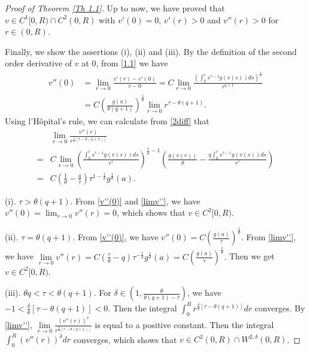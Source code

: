 \documentclass[a4paper,11pt]{amsart}
\theoremstyle{plain}
\theoremstyle{remark}
\numberwithin{equation}{section}
\numberwithin{figure}{section}
\numberwithin{remark}{section}
\begin{document}
\begin{sloppypar}
\begin{proof}[Proof of Theorem \ref{Th 1.1}]
	Up to now, we have proved that $v \in C^1[0, R)\cap C^2(0, R)$ with $v'(0)=0$, $v'(r)>0$ and $v''(r)>0$ for $r\in (0, R)$.
	
	\vspace{2mm}

	Finally, we show the assertions (i), (ii) and (iii). By the definition of the second order derivative of $v$ at $0$, from \eqref{1.1} we have
	\begin{equation}\label{v''(0)}
	\begin{aligned}
	v''(0) & = \lim_{r\to 0} \frac{v'(r)-v'(0)}{r-0} = C \lim_{r\to 0} \frac{ \left(  \int_{0}^{r} s^{\tau-1} g (v(s))ds \right )^{\frac{1}{\theta}}}{r^{q+1}} \\
		& = C \left( \frac{g(a)}{\theta(q+1)} \right)^{\frac{1}{\theta}} \lim_{r\to 0} r^{\tau - \theta (q+1)}.
	\end{aligned}
	\end{equation}
	Using l'H\^opital's rule, we can calculate from \eqref{2diff} that 
	\begin{equation}\label{limv''}
	\begin{aligned}
	   & \lim_{r \to 0} \frac{v''(r)}{r^{\frac{1}{\theta}[\tau - \theta (q+1)]}} \\ 
	= & C \lim_{r \to 0} \left( \frac{\int_{0}^{r} s^{\tau-1} g (v(s))ds}{r^\tau}\right)^{\frac{1}{\theta} - 1} \left ( \frac{g(v(r))}{\theta} - \frac{q \int_{0}^{r} s^{\tau-1} g (v(s))ds}{r^{\tau}} \right ) \\
	= & C \left( \frac{1}{\theta} - \frac{q}{\tau} \right) \tau^{1-\frac{1}{\theta}} g^{\frac{1}{\theta}}(a).
	\end{aligned}
	\end{equation}
	
	(i). $\tau> \theta (q+1)$. From \eqref{v''(0)} and \eqref{limv''}, we have
	$v''(0) = \lim_{r\to 0} v''(r) =0$, which shows that $v\in C^2[0, R)$.
	
	(ii). $\tau = \theta (q+1)$. From \eqref{v''(0)}, we have
	$v''(0) = C \left( \frac{g(a)}{\tau} \right)^{\frac{1}{\theta}}$.
	From \eqref{limv''}, we have
	$
	\lim\limits_{r\to 0}v''(r) = C \left( \frac{\tau}{\theta} - q \right) \tau^{-\frac{1}{\theta}} g^{\frac{1}{\theta}}(a)=C \left( \frac{g(a)}{\tau} \right)^{\frac{1}{\theta}}.
	$
	Then we get $v\in C^2[0, R)$.
	
	(iii). $\theta q < \tau < \theta (q+1)$. For $\delta \in (1, \frac{\theta}{\theta(q+1)-\tau})$, we have $-1<\frac{\delta}{\theta}[\tau - \theta(q+1)]<0$. Then the integral $\int_0^R r^{\frac{\delta}{\theta}[\tau - \theta(q+1)]}dr$ converges. By \eqref{limv''}, $\lim\limits_{r \to 0} \frac{(v''(r))^\delta}{r^{\frac{\delta}{\theta}[\tau - \theta (q+1)]}} $ is equal to a positive constant. Then the integral $\int_0^R (v''(r))^\delta dr$ converges, which shows that $v \in C^2(0, R)\cap W^{2, \delta}(0, R)$.
	

\end{proof}
\end{sloppypar}
\end{document}
